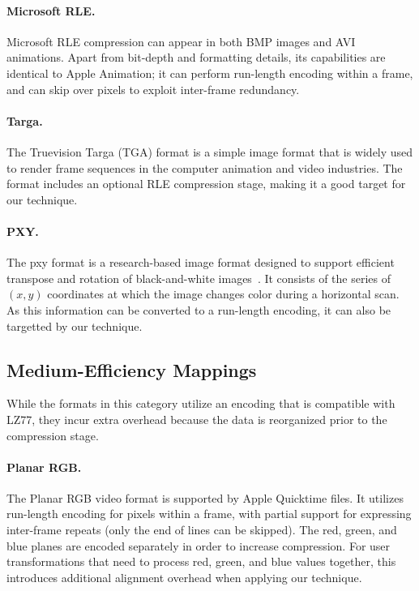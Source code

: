 \paragraph{Microsoft RLE.}
Microsoft RLE compression can appear in both BMP images and AVI
animations.  Apart from bit-depth and formatting details, its
capabilities are identical to Apple Animation; it can perform
run-length encoding within a frame, and can skip over pixels to
exploit inter-frame redundancy.

\paragraph{Targa.}
The Truevision Targa (TGA) format is a simple image format that is
widely used to render frame sequences in the computer animation and
video industries.  The format includes an optional RLE compression
stage, making it a good target for our technique.

\paragraph{PXY.}
The pxy format is a research-based image format designed to support
efficient transpose and rotation of black-and-white
images~\cite{shoji95}.  It consists of the series of $(x,y)$
coordinates at which the image changes color during a horizontal scan.
As this information can be converted to a run-length encoding, it can
also be targetted by our technique.

\subsection{Medium-Efficiency Mappings}
\label{sec:formats-med}

While the formats in this category utilize an encoding that is
compatible with LZ77, they incur extra overhead because the data is
reorganized prior to the compression stage.

\paragraph{Planar RGB.}
The Planar RGB video format is supported by Apple Quicktime files.  It
utilizes run-length encoding for pixels within a frame, with partial
support for expressing inter-frame repeats (only the end of lines can
be skipped).  The red, green, and blue planes are encoded separately
in order to increase compression.  For user transformations that need
to process red, green, and blue values together, this introduces
additional alignment overhead when applying our technique.


